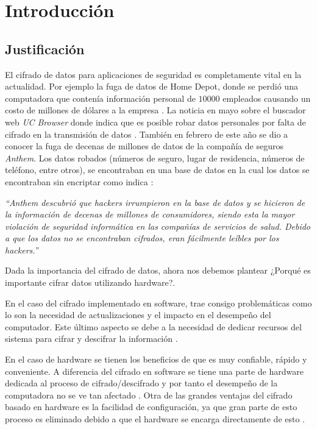 \chapter{Introducción}
\section{Justificación}
El cifrado de datos para aplicaciones de seguridad es completamente vital en la actualidad. Por ejemplo la fuga de datos de Home Depot, donde se perdió una computadora que contenía información personal de $10000$ empleados causando un costo de millones de dólares a la empresa \citep{homeDepot}. La noticia en mayo sobre el buscador web \textit{UC Browser} donde indica que es posible robar datos personales por falta de cifrado en la transmisión de datos \citep{ucBrowser}. También en febrero de este año se dio a conocer la fuga de decenas de millones de datos de la compañía de seguros \textit{Anthem}. Los datos robados (números de seguro, lugar de residencia, números de teléfono, entre otros), se encontraban en una base de datos en la cual los datos se encontraban sin encriptar como indica \cite{anthem}:
\begin{center}
    \begin{minipage}{0.9\linewidth}
        \vspace{5pt}%
        {\small
            \emph{``\textit{Anthem} descubrió que \textit{hackers} irrumpieron en la base de datos y se hicieron de la información de decenas de millones de consumidores, siendo esta la mayor violación de seguridad informática en las compañías de servicios de salud. Debido a que los datos no se encontraban cifrados, eran fácilmente leíbles por los \textit{hackers}.''}
        }
 		\vspace{5pt}%
    \end{minipage}
\end{center}
Dada la importancia del cifrado de datos, ahora nos debemos plantear ¿Porqué es importante cifrar datos utilizando hardware?.

En el caso del cifrado implementado en software, trae consigo problemáticas como lo son la necesidad de actualizaciones y el impacto en el desempeño del computador. Este último aspecto se debe a la necesidad de dedicar recursos del sistema para cifrar y descifrar la información \citep{apricorn}.

En el caso de hardware se tienen los beneficios de que es muy confiable, rápido y conveniente. A diferencia del cifrado en software se tiene una parte de hardware dedicada al proceso de cifrado/descifrado y por tanto el desempeño de la computadora no se ve tan afectado \citep{apricorn}. Otra de las grandes ventajas del cifrado basado en hardware es la facilidad de configuración, ya que gran parte de esto proceso es eliminado debido a que el hardware se encarga directamente de esto \citep{driveTrust}.

